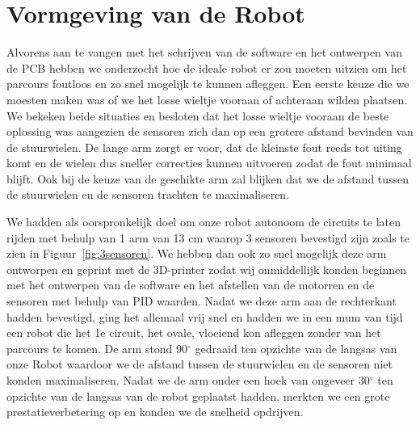  
\chapter{Vormgeving van de Robot}
 




Alvorens aan te vangen met het schrijven van de software en het ontwerpen van de PCB hebben we onderzocht hoe de ideale robot er zou moeten uitzien om het parcours foutloos en zo snel mogelijk te kunnen afleggen. Een eerste keuze die we moesten maken was of we het losse wieltje vooraan of achteraan wilden plaatsen. We bekeken beide situaties en besloten dat het losse wieltje vooraan de beste oplossing was aangezien de sensoren zich dan op een grotere afstand bevinden van de stuurwielen. De lange arm zorgt er voor, dat de kleinste fout reeds tot uiting komt en de wielen dus sneller correcties kunnen uitvoeren zodat de fout minimaal blijft. Ook bij de keuze van de geschikte arm zal blijken dat we  de afstand tussen de stuurwielen en de sensoren trachten te maximaliseren.


We hadden als oorspronkelijk doel om onze robot autonoom de circuits te laten rijden met behulp van 1 arm van 13 cm waarop 3 sensoren bevestigd zijn zoals te zien in Figuur~\ref{fig:3sensoren}. We hebben dan ook zo snel mogelijk deze arm ontworpen en geprint met de 3D-printer zodat wij onmiddellijk konden beginnen met het ontwerpen van de software en het afstellen van de motorren en de sensoren met behulp van PID waarden. Nadat we deze arm aan de rechterkant hadden bevestigd, ging het allemaal vrij snel en hadden we in een mum van tijd een robot die het 1e circuit, het ovale, vloeiend kon afleggen zonder van het parcours te komen. De arm stond 90$^\circ$ gedraaid ten opzichte van de langsas van onze Robot waardoor we de afstand tussen de stuurwielen en de sensoren niet konden maximaliseren. Nadat we de arm onder een hoek van ongeveer 30$^\circ$ ten opzichte van de langsas van de robot geplaatst hadden, merkten we een grote prestatieverbetering op en konden we de snelheid opdrijven.



